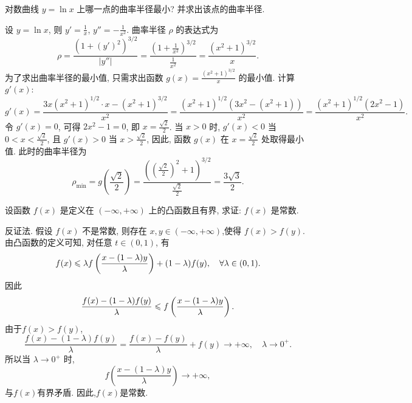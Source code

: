 \begin{exercise}[3.5.13]
    对数曲线 $y = \ln x$ 上哪一点的曲率半径最小? 并求出该点的曲率半径.
\end{exercise}

\begin{solution}
    设 $y = \ln x$, 则 $y' = \frac{1}{x}$, $y'' = -\frac{1}{x^2}$. 曲率半径 $\rho$ 的表达式为
    $$\rho = \frac{(1 + (y')^2)^{3/2}}{|y''|} = \frac{\left(1 + \frac{1}{x^2}\right)^{3/2}}{\frac{1}{x^2}} = \frac{(x^2 + 1)^{3/2}}{x}.$$
    为了求出曲率半径的最小值, 只需求出函数 $g(x) = \frac{(x^2 + 1)^{3/2}}{x}$ 的最小值. 计算 $g'(x)$:
    $$g'(x) = \frac{3x(x^2 + 1)^{1/2} \cdot x - (x^2 + 1)^{3/2}}{x^2} = \frac{(x^2 + 1)^{1/2}(3x^2 - (x^2 + 1))}{x^2} = \frac{(x^2 + 1)^{1/2}(2x^2 - 1)}{x^2}.$$
    令 $g'(x) = 0$, 可得 $2x^2 - 1 = 0$, 即 $x = \frac{\sqrt{2}}{2}$. 当 $x > 0$ 时, $g'(x) < 0$ 当 $0 < x < \frac{\sqrt{2}}{2}$, 且 $g'(x) > 0$ 当 $x > \frac{\sqrt{2}}{2}$, 因此, 函数 $g(x)$ 在 $x = \frac{\sqrt{2}}{2}$ 处取得最小值. 此时的曲率半径为
    $$\rho_{\min} = g\left(\frac{\sqrt{2}}{2}\right) = \frac{\left(\left(\frac{\sqrt{2}}{2}\right)^2 + 1\right)^{3/2}}{\frac{\sqrt{2}}{2}} = \frac{3\sqrt{3}}{2}.$$
\end{solution}

\begin{exercise}[3.5.14]
    设函数 $f(x)$ 是定义在 $(-\infty, +\infty)$ 上的凸函数且有界, 求证: $f(x)$ 是常数.
\end{exercise}

\begin{solution}
    反证法. 假设 $f(x)$ 不是常数, 则存在 $x,y \in (-\infty, +\infty)$,使得 $f(x) > f(y)$. 由凸函数的定义可知, 对任意 $t \in (0, 1)$, 有
    $$f(x) \leqslant \lambda f\left( \frac{x-(1-\lambda)y}{\lambda} \right) + (1 - \lambda) f(y), \quad \forall \lambda \in (0, 1).$$
    因此$$\frac{f(x) - (1-\lambda)f(y)}{\lambda} \leqslant f\left( \frac{x-(1-\lambda)y}{\lambda} \right).$$
    由于$f(x)>f(y)$,$$\frac{f(x) - (1-\lambda)f(y)}{\lambda} = \frac{f(x) - f(y)}{\lambda} + f(y) \to +\infty, \quad \lambda \to 0^+.$$
    所以当 $\lambda \to 0^+$ 时,$$f\left(\frac{x-(1-\lambda)y}{\lambda}\right) \to +\infty,$$与$f(x)$有界矛盾. 因此,$f(x)$是常数.
\end{solution}

\newpage
